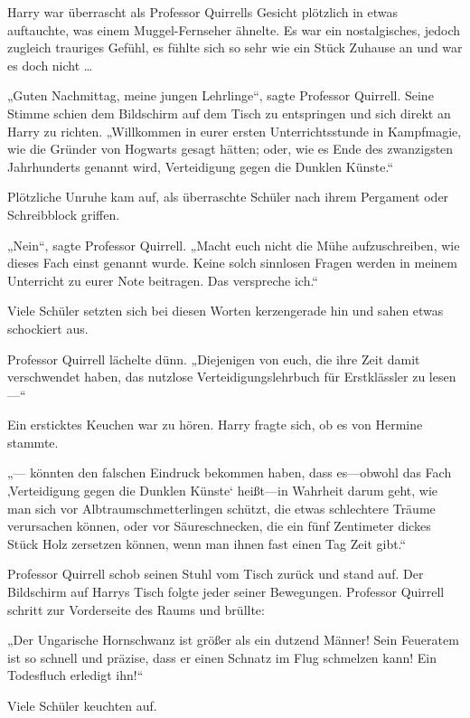 {Harry war überrascht als Professor Quirrells Gesicht plötzlich in etwas auftauchte, was einem Muggel-Fernseher ähnelte. Es war ein nostalgisches, jedoch zugleich trauriges Gefühl, es fühlte sich so sehr wie ein Stück Zuhause an und war es doch nicht …

„Guten Nachmittag, meine jungen Lehrlinge“, sagte Professor Quirrell. Seine Stimme schien dem Bildschirm auf dem Tisch zu entspringen und sich direkt an Harry zu richten. „Willkommen in eurer ersten Unterrichtsstunde in Kampfmagie, wie die Gründer von Hogwarts gesagt hätten; oder, wie es Ende des zwanzigsten Jahrhunderts genannt wird, Verteidigung gegen die Dunklen Künste.“

Plötzliche Unruhe kam auf, als überraschte Schüler nach ihrem Pergament oder Schreibblock griffen.

„Nein“, sagte Professor Quirrell. „Macht euch nicht die Mühe aufzuschreiben, wie dieses Fach einst genannt wurde. Keine solch sinnlosen Fragen werden in meinem Unterricht zu eurer Note beitragen. Das verspreche ich.“

Viele Schüler setzten sich bei diesen Worten kerzengerade hin und sahen etwas schockiert aus.

Professor Quirrell lächelte dünn. „Diejenigen von euch, die ihre Zeit damit verschwendet haben, das nutzlose Verteidigungslehrbuch für Erstklässler zu lesen —“

Ein ersticktes Keuchen war zu hören. Harry fragte sich, ob es von Hermine stammte.

„— könnten den falschen Eindruck bekommen haben, dass es—obwohl das Fach ‚Verteidigung gegen die Dunklen Künste` heißt—in Wahrheit darum geht, wie man sich vor Albtraumschmetterlingen schützt, die etwas schlechtere Träume verursachen können, oder vor Säureschnecken, die ein fünf Zentimeter dickes Stück Holz zersetzen können, wenn man ihnen fast einen Tag Zeit gibt.“

Professor Quirrell schob seinen Stuhl vom Tisch zurück und stand auf. Der Bildschirm auf Harrys Tisch folgte jeder seiner Bewegungen. Professor Quirrell schritt zur Vorderseite des Raums und brüllte:

„Der Ungarische Hornschwanz ist größer als ein dutzend Männer! Sein Feueratem ist so schnell und präzise, dass er einen Schnatz im Flug schmelzen kann! Ein Todesfluch erledigt ihn!“

Viele Schüler keuchten auf.

}
